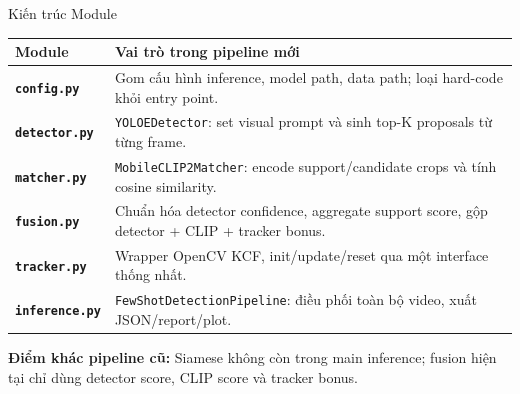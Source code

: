 \documentclass[aspectratio=169]{beamer}
\begin{document}
\begin{frame}{Kiến trúc Module}
  \small
  \begin{tabularx}{\linewidth}{>{\bfseries}lX}
    \toprule
    Module & Vai trò trong pipeline mới \\
    \midrule
    \texttt{config.py} & Gom cấu hình inference, model path, data path; loại hard-code khỏi entry point. \\
    \texttt{detector.py} & \texttt{YOLOEDetector}: set visual prompt và sinh top-K proposals từ từng frame. \\
    \texttt{matcher.py} & \texttt{MobileCLIP2Matcher}: encode support/candidate crops và tính cosine similarity. \\
    \texttt{fusion.py} & Chuẩn hóa detector confidence, aggregate support score, gộp detector + CLIP + tracker bonus. \\
    \texttt{tracker.py} & Wrapper OpenCV KCF, init/update/reset qua một interface thống nhất. \\
    \texttt{inference.py} & \texttt{FewShotDetectionPipeline}: điều phối toàn bộ video, xuất JSON/report/plot. \\
    \bottomrule
  \end{tabularx}
  \vspace{0.22cm}
  {\small\bfseries\color{DeepBlue}Điểm khác pipeline cũ:}
  {\small Siamese không còn trong main inference; fusion hiện tại chỉ dùng detector score, CLIP score và tracker bonus.}
\end{frame}
\end{document}
